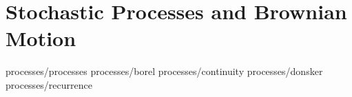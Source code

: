 \chapter	{Stochastic Processes and Brownian Motion}

	{processes/processes}
	{processes/borel}
	{processes/continuity}
	{processes/donsker}
	{processes/recurrence}
